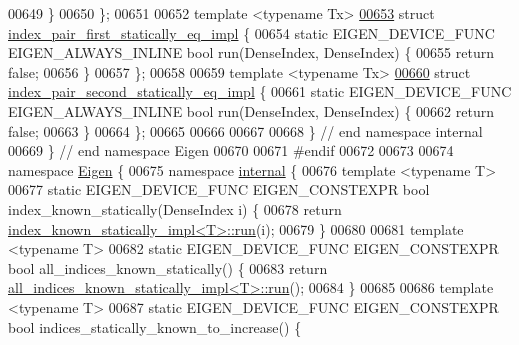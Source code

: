 \begin{DoxyCode}
00649   \}
00650 \};
00651 
00652 \textcolor{keyword}{template} <\textcolor{keyword}{typename} Tx>
\hyperlink{struct_eigen_1_1internal_1_1index__pair__first__statically__eq__impl}{00653} \textcolor{keyword}{struct }\hyperlink{struct_eigen_1_1internal_1_1index__pair__first__statically__eq__impl}{index\_pair\_first\_statically\_eq\_impl} \{
00654   \textcolor{keyword}{static} EIGEN\_DEVICE\_FUNC EIGEN\_ALWAYS\_INLINE \textcolor{keywordtype}{bool} run(DenseIndex, DenseIndex) \{
00655     \textcolor{keywordflow}{return} \textcolor{keyword}{false};
00656   \}
00657 \};
00658 
00659 \textcolor{keyword}{template} <\textcolor{keyword}{typename} Tx>
\hyperlink{struct_eigen_1_1internal_1_1index__pair__second__statically__eq__impl}{00660} \textcolor{keyword}{struct }\hyperlink{struct_eigen_1_1internal_1_1index__pair__second__statically__eq__impl}{index\_pair\_second\_statically\_eq\_impl} \{
00661   \textcolor{keyword}{static} EIGEN\_DEVICE\_FUNC EIGEN\_ALWAYS\_INLINE \textcolor{keywordtype}{bool} run(DenseIndex, DenseIndex) \{
00662     \textcolor{keywordflow}{return} \textcolor{keyword}{false};
00663   \}
00664 \};
00665 
00666 
00667 
00668 \}  \textcolor{comment}{// end namespace internal}
00669 \}  \textcolor{comment}{// end namespace Eigen}
00670 
00671 \textcolor{preprocessor}{#endif}
00672 
00673 
00674 \textcolor{keyword}{namespace }\hyperlink{namespace_eigen}{Eigen} \{
00675 \textcolor{keyword}{namespace }\hyperlink{namespaceinternal}{internal} \{
00676 \textcolor{keyword}{template} <\textcolor{keyword}{typename} T>
00677 \textcolor{keyword}{static} EIGEN\_DEVICE\_FUNC EIGEN\_CONSTEXPR \textcolor{keywordtype}{bool} index\_known\_statically(DenseIndex i) \{
00678   \textcolor{keywordflow}{return} \hyperlink{struct_eigen_1_1internal_1_1index__known__statically__impl}{index\_known\_statically\_impl<T>::run}(i);
00679 \}
00680 
00681 \textcolor{keyword}{template} <\textcolor{keyword}{typename} T>
00682 \textcolor{keyword}{static} EIGEN\_DEVICE\_FUNC EIGEN\_CONSTEXPR \textcolor{keywordtype}{bool} all\_indices\_known\_statically() \{
00683   \textcolor{keywordflow}{return} \hyperlink{struct_eigen_1_1internal_1_1all__indices__known__statically__impl}{all\_indices\_known\_statically\_impl<T>::run}();
00684 \}
00685 
00686 \textcolor{keyword}{template} <\textcolor{keyword}{typename} T>
00687 \textcolor{keyword}{static} EIGEN\_DEVICE\_FUNC EIGEN\_CONSTEXPR \textcolor{keywordtype}{bool} indices\_statically\_known\_to\_increase() \{

\end{DoxyCode}
